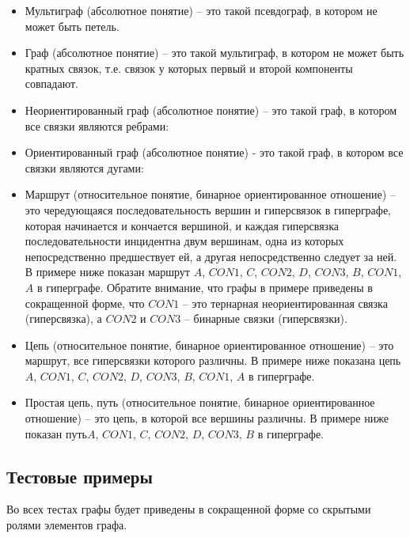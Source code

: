 \begin{itemize}
\item Мультиграф (абсолютное понятие) – это такой псевдограф, в
  котором не может быть петель.
 
\item Граф (абсолютное понятие) – это такой мультиграф, в котором не
  может быть кратных связок, т.е. связок у которых первый и второй
  компоненты совпадают.
 
\item Неориентированный граф (абсолютное понятие) – это такой граф, в
  котором все связки являются ребрами:
 
\item Ориентированный граф (абсолютное понятие) - это такой граф, в
  котором все связки являются дугами:
 
\item Маршрут (относительное понятие, бинарное ориентированное
  отношение) – это чередующаяся последовательность вершин и
  гиперсвязок в гиперграфе, которая начинается и кончается вершиной, и
  каждая гиперсвязка последовательности инцидентна двум вершинам, одна
  из которых непосредственно предшествует ей, а другая непосредственно
  следует за ней. В примере ниже показан маршрут $A$, $CON1$, $C$,
  $CON2$, $D$, $CON3$, $B$, $CON1$, $A$ в гиперграфе. Обратите внимание, что
  графы в примере приведены в сокращенной форме, что $CON1$ – это
  тернарная неориентированная связка (гиперсвязка), а $CON2$ и $CON3$ –
  бинарные связки (гиперсвязки).
 
\item Цепь (относительное понятие, бинарное ориентированное отношение)
  – это маршрут, все гиперсвязки которого различны. В примере ниже
  показана цепь $A$, $CON1$, $C$, $CON2$, $D$, $CON3$, $B$, $CON1$,
  $A$ в гиперграфе.
 
\item Простая цепь, путь (относительное понятие, бинарное
  ориентированное отношение) – это цепь, в которой все вершины
  различны. В примере ниже показан путь$A$, $CON1$, $C$, $CON2$, $D$,
  $CON3$, $B$ в гиперграфе.

\end{itemize}

\subsection{Тестовые примеры}
\label{sec:-Graph_onto_tests}

Во всех тестах графы будет приведены в сокращенной форме со скрытыми
ролями элементов графа.

